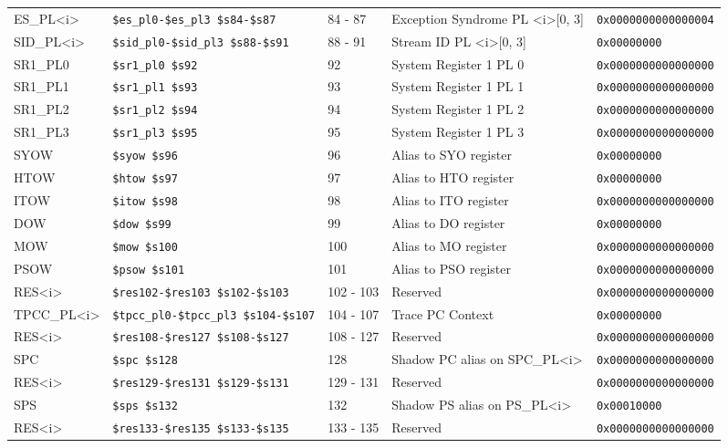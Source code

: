 {\begin{tabular}{|l|l|l|l|l|}
ES\_PL\textless i\textgreater & \verb|$es_pl0-$es_pl3 $s84-$s87| & 84 - 87 & Exception Syndrome PL \textless i\textgreater [0, 3] & \verb|0x0000000000000004| \\
SID\_PL\textless i\textgreater & \verb|$sid_pl0-$sid_pl3 $s88-$s91| & 88 - 91 & Stream ID PL \textless i\textgreater [0, 3] & \verb|0x00000000| \\
SR1\_PL0 & \verb|$sr1_pl0 $s92| & 92 & System Register 1 PL 0 & \verb|0x0000000000000000| \\
SR1\_PL1 & \verb|$sr1_pl1 $s93| & 93 & System Register 1 PL 1 & \verb|0x0000000000000000| \\
SR1\_PL2 & \verb|$sr1_pl2 $s94| & 94 & System Register 1 PL 2 & \verb|0x0000000000000000| \\
SR1\_PL3 & \verb|$sr1_pl3 $s95| & 95 & System Register 1 PL 3 & \verb|0x0000000000000000| \\
SYOW & \verb|$syow $s96| & 96 & Alias to SYO register & \verb|0x00000000| \\
HTOW & \verb|$htow $s97| & 97 & Alias to HTO register & \verb|0x00000000| \\
ITOW & \verb|$itow $s98| & 98 & Alias to ITO register & \verb|0x0000000000000000| \\
DOW & \verb|$dow $s99| & 99 & Alias to DO register & \verb|0x00000000| \\
MOW & \verb|$mow $s100| & 100 & Alias to MO register & \verb|0x0000000000000000| \\
PSOW & \verb|$psow $s101| & 101 & Alias to PSO register & \verb|0x0000000000000000| \\
RES\textless i\textgreater & \verb|$res102-$res103 $s102-$s103| & 102 - 103 & Reserved & \verb|0x0000000000000000| \\
TPCC\_PL\textless i\textgreater & \verb|$tpcc_pl0-$tpcc_pl3 $s104-$s107| & 104 - 107 & Trace PC Context & \verb|0x00000000| \\
RES\textless i\textgreater & \verb|$res108-$res127 $s108-$s127| & 108 - 127 & Reserved & \verb|0x0000000000000000| \\
SPC & \verb|$spc $s128| & 128 & Shadow PC alias on SPC\_PL\textless i\textgreater & \verb|0x0000000000000000| \\
RES\textless i\textgreater & \verb|$res129-$res131 $s129-$s131| & 129 - 131 & Reserved & \verb|0x0000000000000000| \\
SPS & \verb|$sps $s132| & 132 & Shadow PS alias on PS\_PL\textless i\textgreater & \verb|0x00010000| \\
RES\textless i\textgreater & \verb|$res133-$res135 $s133-$s135| & 133 - 135 & Reserved & \verb|0x0000000000000000| \\

\end{tabular}}

